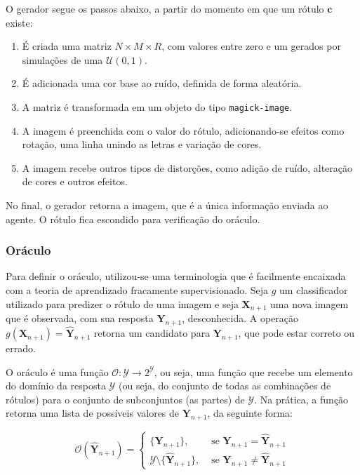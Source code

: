 \documentclass[12pt,twoside,brazilian]{book}
\providecommand{\tightlist}{%
  \setlength{\itemsep}{0pt}\setlength{\parskip}{0pt}}
\begin{document}
O gerador segue os passos abaixo, a partir do momento em que um rótulo
\(\mathbf c\) existe:

\begin{enumerate}
\def\labelenumi{\arabic{enumi}.}
\tightlist
\item
  É criada uma matriz \(N\times M \times R\), com valores entre zero e
  um gerados por simulações de uma \(\mathcal U(0,1)\).
\item
  É adicionada uma cor base ao ruído, definida de forma aleatória.
\item
  A matriz é transformada em um objeto do tipo \texttt{magick-image}.
\item
  A imagem é preenchida com o valor do rótulo, adicionando-se efeitos
  como rotação, uma linha unindo as letras e variação de cores.
\item
  A imagem recebe outros tipos de distorções, como adição de ruído,
  alteração de cores e outros efeitos.
\end{enumerate}

No final, o gerador retorna a imagem, que é a única informação enviada
ao agente. O rótulo fica escondido para verificação do oráculo.

\hypertarget{sec-oraculo}{%
\subsubsection{Oráculo}\label{sec-oraculo}}

Para definir o oráculo, utilizou-se uma terminologia que é facilmente
encaixada com a teoria de aprendizado fracamente supervisionado. Seja
\(g\) um classificador utilizado para predizer o rótulo de uma imagem e
seja \(\mathbf X_{n+1}\) uma nova imagem que é observada, com sua
resposta \(\mathbf Y_{n+1}\), desconhecida. A operação
\(g(\mathbf X_{n+1}) = \hat {\mathbf Y}_{n+1}\) retorna um candidato
para \(\mathbf Y_{n+1}\), que pode estar correto ou errado.

O oráculo é uma função
\(\mathcal O: \mathcal Y \rightarrow 2^{\mathcal Y}\), ou seja, uma
função que recebe um elemento do domínio da resposta \(\mathcal Y\) (ou
seja, do conjunto de todas as combinações de rótulos) para o conjunto de
subconjuntos (as partes) de \(\mathcal Y\). Na prática, a função retorna
uma lista de possíveis valores de \({\mathbf Y}_{n+1}\), da seguinte
forma:

\[
\mathcal O(\hat {\mathbf Y}_{n+1}) = \left\{\begin{array}{ll}
    \{\mathbf Y_{n+1}\}, & \text{ se } \mathbf Y_{n+1} = \hat {\mathbf Y}_{n+1}  \\
    \mathcal Y \setminus \{\hat {\mathbf Y}_{n+1}\}, & \text{ se } \mathbf Y_{n+1} \neq \hat {\mathbf Y}_{n+1}
\end{array}\right.
\]
\end{document}
